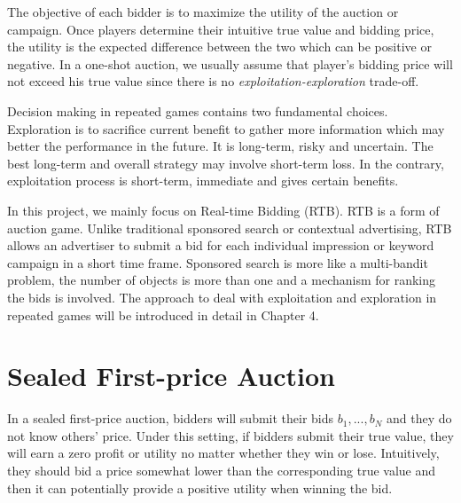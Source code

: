 The objective of each bidder is to maximize the utility of the auction or campaign. Once players determine their intuitive true value and bidding price, the utility is the expected difference between the two which can be positive or negative. In a one-shot auction, we usually assume that player's bidding price will not exceed his true value since there is no \emph{exploitation-exploration} trade-off.

Decision making in repeated games contains two fundamental choices. Exploration is to sacrifice current benefit to gather more information which may better the performance in the future. It is long-term, risky and uncertain. The best long-term and overall strategy may involve short-term loss. In the contrary, exploitation process is short-term, immediate and gives certain benefits. 

In this project, we mainly focus on Real-time Bidding (RTB). RTB is a form of auction game. Unlike traditional sponsored search or contextual advertising, RTB allows an advertiser to submit a bid for each individual impression or keyword campaign in a short time frame. Sponsored search is more like a multi-bandit problem, the number of objects is more than one and a mechanism for ranking the bids is involved. The approach to deal with exploitation and exploration in repeated games will be introduced in detail in Chapter 4.

\section{Sealed First-price Auction}
In a sealed first-price auction, bidders will submit their bids $b_1,...,b_N$ and they do not know others' price. Under this setting, if bidders submit their true value, they will earn a zero profit or utility no matter whether they win or lose. Intuitively, they should bid a price somewhat lower than the corresponding true value and then it can potentially provide a positive utility when winning the bid.


